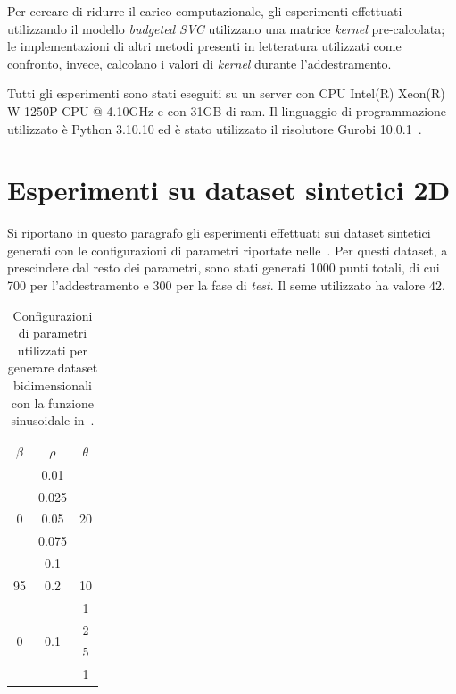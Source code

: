 Per cercare di ridurre il carico computazionale, gli esperimenti effettuati utilizzando il modello \emph{budgeted SVC} utilizzano una matrice \emph{kernel} pre-calcolata; le implementazioni di altri metodi presenti in letteratura utilizzati come confronto, invece, calcolano i valori di \emph{kernel} durante l'addestramento.

Tutti gli esperimenti sono stati eseguiti su un server con CPU Intel(R) Xeon(R) W-1250P CPU @ 4.10GHz e con 31GB di ram. Il linguaggio di programmazione utilizzato è Python 3.10.10 ed è stato utilizzato il risolutore Gurobi 10.0.1~\cite{gurobi}.

\section{Esperimenti su dataset sintetici 2D}\label{sec:exp:synth_2d}
Si riportano in questo paragrafo gli esperimenti effettuati sui dataset sintetici generati con le configurazioni di parametri riportate nelle~.
Per questi dataset, a prescindere dal resto dei parametri, sono stati generati 1000 punti totali, di cui 700 per l'addestramento e 300 per la fase di \emph{test}. Il seme utilizzato ha valore $42$.
\begin{table}
    \centering
    \begin{tabular}{ccc}
        \toprule
        $\beta$ & $\rho$ & $\theta$\\
        \midrule
        \multirow{5}{*}{0}  & 0.01  & \multirow{5}{*}{20} \\        
                            & 0.025 &     \\        
                            & 0.05  &     \\        
                            & 0.075 &     \\        
                            & 0.1   &     \\
        \hline
        95                  & 0.2   & 10    \\   
        \hline
        \multirow{4}{*}{0}  & \multirow{4}{*}{0.1}  & 1     \\    
                            &                       & 2     \\    
                            &                       & 5     \\    
                            &                       & 1     \\    
        \bottomrule
    \end{tabular}
    \caption{Configurazioni di parametri utilizzati per generare dataset bidimensionali con la funzione sinusoidale in~.}
    \label{tab:parametri_ds_sin}
\end{table}
